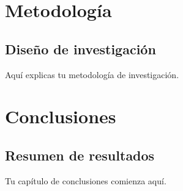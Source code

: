 \documentclass[a4paper]{report}
\begin{document}




\tableofcontents





\chapter{Metodología}
\section{Diseño de investigación}
Aquí explicas tu metodología de investigación.


\chapter{Conclusiones}
\section{Resumen de resultados}
Tu capítulo de conclusiones comienza aquí.

\begin{thebibliography}{}
\end{thebibliography}

\printglossaries
{}

\listoffigures

\listoftables



\end{document}
